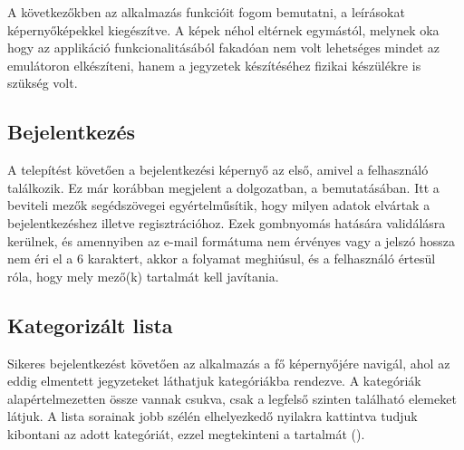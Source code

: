 A következőkben az alkalmazás funkcióit fogom bemutatni, a leírásokat képernyőképekkel kiegészítve. A képek néhol eltérnek egymástól, melynek oka hogy az applikáció funkcionalitásából fakadóan nem volt lehetséges mindet az emulátoron elkészíteni, hanem a jegyzetek készítéséhez fizikai készülékre is szükség volt.

\subsection{Bejelentkezés}
A telepítést követően a bejelentkezési képernyő az első, amivel a felhasználó találkozik. Ez már korábban megjelent a dolgozatban, a  bemutatásában. Itt a beviteli mezők segédszövegei egyértelműsítik, hogy milyen adatok elvártak a bejelentkezéshez illetve regisztrációhoz. Ezek gombnyomás hatására validálásra kerülnek, és amennyiben az e-mail formátuma nem érvényes vagy a jelszó hossza nem éri el a 6 karaktert, akkor a folyamat meghiúsul, és a felhasználó értesül róla, hogy mely mező(k) tartalmát kell javítania.

\subsection{Kategorizált lista}
Sikeres bejelentkezést követően az alkalmazás a fő képernyőjére navigál, ahol az eddig elmentett jegyzeteket láthatjuk kategóriákba rendezve. A kategóriák alapértelmezetten össze vannak csukva, csak a legfelső szinten található elemeket látjuk. A lista sorainak jobb szélén elhelyezkedő nyilakra kattintva tudjuk kibontani az adott kategóriát, ezzel megtekinteni a tartalmát ().

